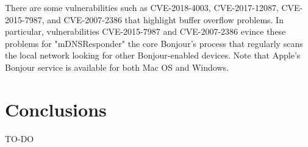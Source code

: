 \documentclass[fleqn, 11pt]{SelfArx} %
\begin{document}
There are some vulnerabilities such as CVE-2018-4003, CVE-2017-12087, CVE-2015-7987, and CVE-2007-2386 that highlight buffer overflow problems. In particular, vulnerabilities CVE-2015-7987 and CVE-2007-2386 evince these problems for "mDNSResponder" the core Bonjour's process that regularly scans the local network looking for other Bonjour-enabled devices. Note that Apple's Bonjour service is available for both Mac OS and Windows.  

\section{Conclusions}
TO-DO





\end{document}
